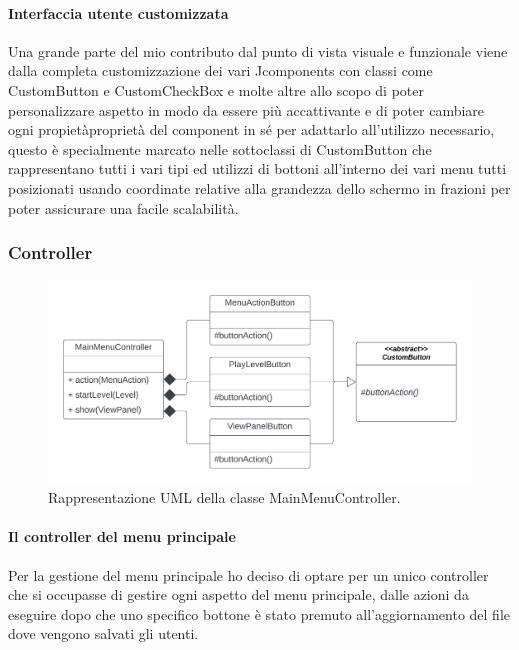 \documentclass[a4paper,12pt]{report}
\begin{document}
    \paragraph{Interfaccia utente customizzata} Una grande parte del mio contributo dal punto di vista visuale e funzionale viene dalla completa customizzazione dei vari Jcomponents con classi come CustomButton e CustomCheckBox e molte altre allo scopo di poter personalizzare aspetto in modo da essere più accattivante e di poter cambiare ogni propietàproprietà del component in sé per adattarlo all’utilizzo necessario, questo è specialmente marcato nelle sottoclassi di CustomButton che rappresentano tutti i vari tipi ed utilizzi di bottoni all’interno dei vari menu tutti posizionati usando coordinate relative alla grandezza dello schermo in frazioni per poter assicurare una facile scalabilità.

    \subsubsection{Controller}

    \begin{figure}[H]
        \centering{}
        \includegraphics[scale=0.8] {img/menu-controller.png}
        \caption{Rappresentazione UML della classe MainMenuController.}
        \label{img:menu-controller}
    \end{figure}

    \paragraph{Il controller del menu principale} Per la gestione del menu principale ho deciso di optare per un unico controller che si occupasse di gestire ogni aspetto del menu principale, dalle azioni da eseguire dopo che uno specifico bottone è stato premuto all’aggiornamento del file dove vengono salvati gli utenti.
\end{document}
